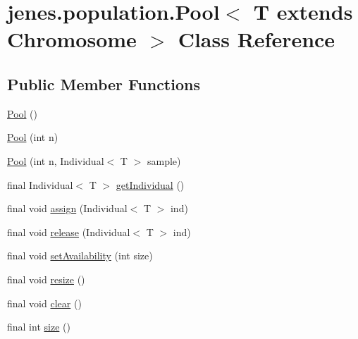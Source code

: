 \hypertarget{classjenes_1_1population_1_1_pool_3_01_t_01extends_01_chromosome_01_4}{
\section{jenes.population.Pool$<$ T extends Chromosome $>$ Class Reference}
\label{classjenes_1_1population_1_1_pool_3_01_t_01extends_01_chromosome_01_4}
}
\subsection*{Public Member Functions}
\begin{CompactItemize}
\item 
\hyperlink{classjenes_1_1population_1_1_pool_3_01_t_01extends_01_chromosome_01_4_4bd84795aaada004e3abac72137269fa}{Pool} ()
\item 
\hyperlink{classjenes_1_1population_1_1_pool_3_01_t_01extends_01_chromosome_01_4_1f1455e87c094df383563c96e88c4d1b}{Pool} (int n)
\item 
\hyperlink{classjenes_1_1population_1_1_pool_3_01_t_01extends_01_chromosome_01_4_4326e7c61485eebd85e0ee33ade6ae4a}{Pool} (int n, Individual$<$ T $>$ sample)
\item 
final Individual$<$ T $>$ \hyperlink{classjenes_1_1population_1_1_pool_3_01_t_01extends_01_chromosome_01_4_56aa9e4c1a8fb6c95c88cbc09f677400}{getIndividual} ()
\item 
final void \hyperlink{classjenes_1_1population_1_1_pool_3_01_t_01extends_01_chromosome_01_4_ea055f4f71829a56c9d16780d010e861}{assign} (Individual$<$ T $>$ ind)
\item 
final void \hyperlink{classjenes_1_1population_1_1_pool_3_01_t_01extends_01_chromosome_01_4_5fce371a24676e555aca961e61fb55ae}{release} (Individual$<$ T $>$ ind)
\item 
final void \hyperlink{classjenes_1_1population_1_1_pool_3_01_t_01extends_01_chromosome_01_4_625297bb7b48e3b6ab11c081874580bf}{setAvailability} (int size)
\item 
final void \hyperlink{classjenes_1_1population_1_1_pool_3_01_t_01extends_01_chromosome_01_4_c9cfd19d4ef83db5f3b1e805458714c2}{resize} ()
\item 
final void \hyperlink{classjenes_1_1population_1_1_pool_3_01_t_01extends_01_chromosome_01_4_05198e410de8e3d8d12f5598daf079bd}{clear} ()
\item 
final int \hyperlink{classjenes_1_1population_1_1_pool_3_01_t_01extends_01_chromosome_01_4_71999d0d1f42f4448c7615cd43bea2f8}{size} ()

\end{CompactItemize}
